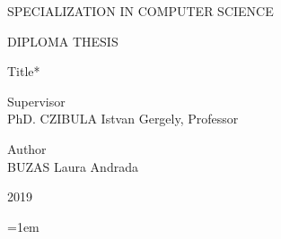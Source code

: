 \documentclass[12pt]{extreport}
\begin{document}
\begin{titlepage}
        \begin{center}
        {\Large SPECIALIZATION IN COMPUTER SCIENCE}
        \end{center}

        \vfill

        \begin{center}
        {\LARGE DIPLOMA THESIS}
        \end{center}

        \begin{center}
        {\Huge *Title*}
        \end{center}

        \vfill

        \begin{flushleft}
        {\LARGE Supervisor \\ PhD. CZIBULA Istvan Gergely, Professor}
        \end{flushleft}

        \begin{flushright}
        {\Large Author \\ BUZAS Laura Andrada}
        \end{flushright}

        \vfill

        \begin{center}
        {\LARGE 2019}
    \end{center}

    \end{titlepage}
    \restoregeometry
    \pagestyle{plain}

    

    \tableofcontents
    \pagebreak

    

    
    
    
    
    
    \titleformat{\chapter}{}{}{0em}{\bfseries\LARGE}
    \nocite{*}
    \emergencystretch=1em
    \printbibliography[heading=bibintoc, title={}]
\end{document}
